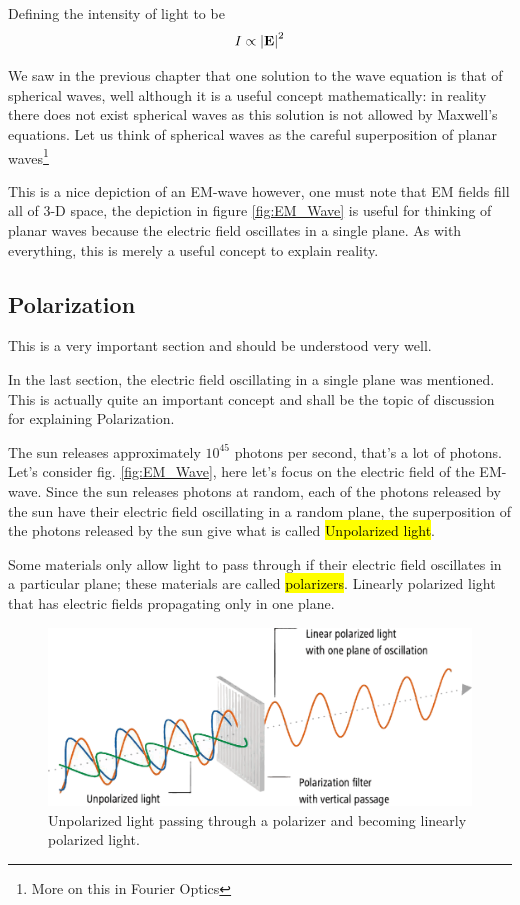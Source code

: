 \documentclass{article}
\begin{document}
Defining the intensity of light to be
\begin{equation}
    I \propto \abs{\textbf{E}}^2
    \label{Intensity}
\end{equation}

We saw in the previous chapter that one solution to the wave equation is that of spherical waves, well although it is a useful concept mathematically: in reality there does not exist spherical waves as this solution is not allowed by Maxwell's equations. Let us think of spherical waves as the careful superposition of planar waves\footnote{More on this in Fourier Optics}

This is a nice depiction of an EM-wave however, one must note that EM fields fill all of 3-D space, the depiction in figure \ref{fig:EM_Wave} is useful for thinking of planar waves because the electric field oscillates in a single plane. As with everything, this is merely a useful concept to explain reality.


\subsection{Polarization}
This is a very important section and should be understood very well.

In the last section, the electric field oscillating in a single plane was mentioned. This is actually quite an important concept and shall be the topic of discussion for explaining Polarization.


The sun releases approximately $10^{45}$ photons per second, that's a lot of photons. Let's consider fig. \ref{fig:EM_Wave}, here let's focus on the electric field of the EM-wave. Since the sun releases photons at random, each of the photons released by the sun have their electric field oscillating in a random plane, the superposition of the photons released by the sun give what is called \hl{Unpolarized light}.

Some materials only allow light to pass through if their electric field oscillates in a particular plane; these materials are called \hl{polarizers}.
Linearly polarized light that has electric fields propagating only in one plane.
\begin{figure}[!phbt]
    \centering
    \includegraphics[width=0.6\linewidth]{img/Unpolarized.eps}
    \caption{Unpolarized light passing through a polarizer and becoming linearly polarized light.}
    \label{fig:unpolarized}
    \nocite{unpolarized}
\end{figure}
\end{document}
